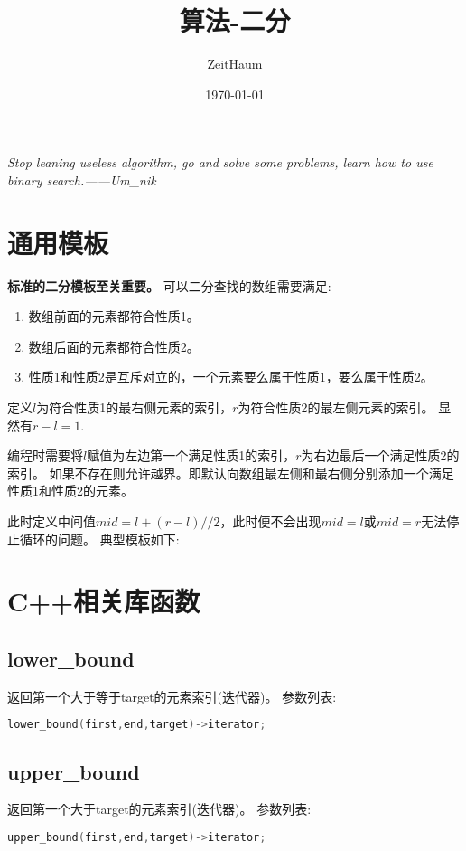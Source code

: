 \documentclass{article}
\author{ZeitHaum}
\date{\today}
\title{算法-二分}
\begin{document}
    \maketitle
    \newpage 
    \tableofcontents
    \newpage
    \setcounter{page}{1}
    \emph{Stop leaning useless algorithm, go and solve some problems, learn how to use binary search.——Um\_nik}
    \section{通用模板}
    \textbf{标准的二分模板至关重要。}
    可以二分查找的数组需要满足:
    \begin{enumerate}
        \item 数组前面的元素都符合性质1。
        \item 数组后面的元素都符合性质2。
        \item 性质1和性质2是互斥对立的，一个元素要么属于性质1，要么属于性质2。
    \end{enumerate}

    定义$l$为符合性质1的最右侧元素的索引，$r$为符合性质2的最左侧元素的索引。
    显然有$r - l = 1.$

    编程时需要将$l$赋值为左边第一个满足性质1的索引，$r$为右边最后一个满足性质2的索引。
    如果不存在则允许越界。即默认向数组最左侧和最右侧分别添加一个满足性质1和性质2的元素。

    此时定义中间值$mid = l + (r - l)//2$，此时便不会出现$mid = l$或$mid = r$无法停止循环的问题。
    典型模板如下:

    

    \section{C++相关库函数}
    \subsection{lower\_bound}
    返回第一个大于等于target的元素索引(迭代器)。
    参数列表:
    \begin{lstlisting}[language=c++]
        lower_bound(first,end,target)->iterator;
    \end{lstlisting}
    
    \subsection{upper\_bound}
    返回第一个大于target的元素索引(迭代器)。
    参数列表:
    \begin{lstlisting}[language=c++]
        upper_bound(first,end,target)->iterator;
    \end{lstlisting}
\end{document}
